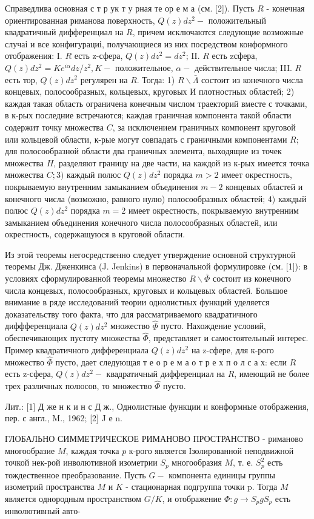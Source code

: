 \documentclass[10pt]{article}
\begin{document}
Справедлива основная с т р ук т у рная те ор е м а (см. [2]). Пусть $R$ - конечная ориентированная риманова поверхность, $Q(z) d z^{2}-$ положительный квадратичный дифференциал на $R$, причем исключаются следующие возможные случаі и все конфигурациі, получающиеся из них посредством конформного отображения: I. $R$ есть z-сфера, $Q(z) d z^{2}=d z^{2}$; II. $R$ есть zсфера, $Q(z) d z^{2}=K e^{i \alpha} d z / z^{2}, K-$ положительное, $\alpha-$ действительное числа; III. $R$ есть тор, $Q(z) d z^{2}$ регулярен на $R$. Тогда: 1) $R \backslash \bar{\Lambda}$ состоит из конечного числа концевых, полосообразных, кольцевых, круговых И плотностных областей; 2) каждая такая область ограничена конечным числом траекторий вместе с точками, в к-рых последние встречаются; каждая граничная компонента такой области содержит точку множества $C$, за исключением граничных компонент круговой или кольцевой области, к-рые могут совпадать с граничными компонентами $R$; для полосообразной области два граничных элемента, выходящие из точек множества $H$, разделяют границу на две части, на каждой из к-рых имеется точка множества $C ; 3)$ каждый полюс $Q(z) d z^{2}$ порядка $m>2$ имеет окрестность, покрываемую внутренним замыканием объединения $m-2$ концевых областей и конечного числа (возможно, равного нулю) полосообразных областей; 4) каждый полюс $Q(z) d z^{2}$ порядка $m=2$ имеет окрестность, покрываемую внутренним замыканием объединения конечного числа полосообразных областей, или окрестность, содержащуюся в круговой области.



Из этой теоремы негосредственно следует утверждение основной структурной теоремы Дж. Дженкинса (J. Jenkins) в первоначальной формулировке (см. [1]): в условиях сформулированной теоремы множество $R \backslash \bar{\Phi}$ состоит из конечного числа концевых, полосообразных, круговых и кольцевых областей. Большое внимание в ряде исследований теории однолистных функций уделяется доказательству того факта, что для рассматриваемого квадратичного диффференциала $Q(z) d z^{2}$ множество $\widehat{\Phi}$ пусто. Нахождение условий, обеспечивающих пустоту множества $\widehat{\Phi}$, представляет и самостоятельный интерес. Пример квадратичного дифференциала $Q(z) d z^{2}$ на z-сфере, для к-рого множество $\widehat{\Phi}$ пусто, дает следующая т е о р е м а $о$ т р е х п о л с а х: если $R$ есть z-сфера, $Q(z) d z^{2}-$ квадратичный дифференциал на $R$, имеющий не более трех различных полюсов, то множество $\widehat{\Phi}$ пусто.



Лит.: [1] Д же н к и н с Д ж., Однолистные функции и конформные отображения, пер. с англ., M., 1962; [2] J е n.



ГЛОБАЛЬНО СИММЕТРИЧЕСКОЕ РИМАНОВО ПРОСТРАНСТВО - риманово многообразие $M$, каждая точка $p$ к-рого является Ізолированной неподвижной точкой нек-рой инволютивной изометрии $S_{p}$ многообразия $M$, т. е. $S_{p}^{2}$ есть тождественное преобразование. Пусть $G-$ компонента единицы группы изометрий пространства $M$ и $K$ - стационарная подгруппа точки p. Тогда $M$ является однородным пространством $G / K$, и отображение $\Phi: g \rightarrow S_{p} g S_{p}$ есть инволютивный авто-
\end{document}
